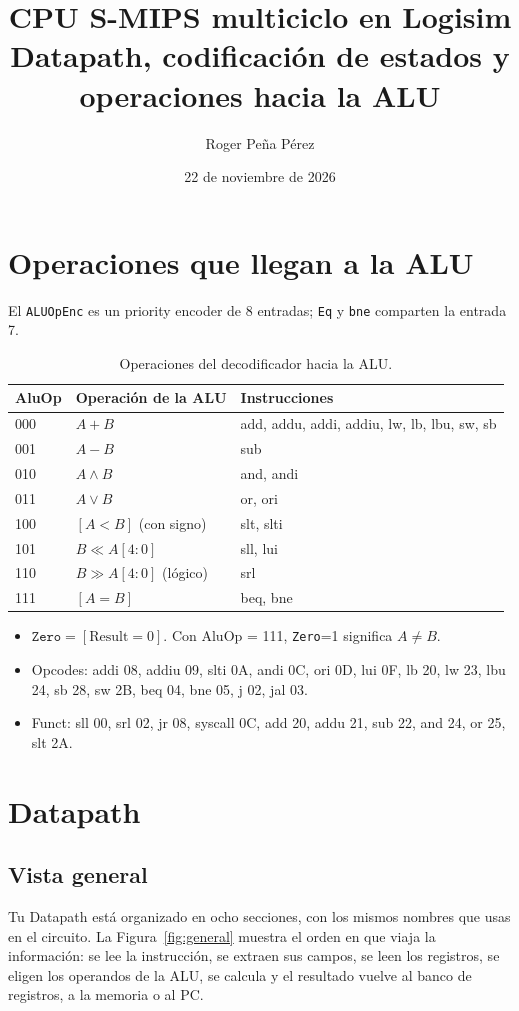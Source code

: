 \documentclass[11pt,a4paper]{article}
\title{CPU S-MIPS multiciclo en Logisim\\[2pt]\large Datapath, codificaci\'on de estados y operaciones hacia la ALU}
\author{Roger Pe\~na P\'erez}
\date{22 de noviembre de 2026}
\newcommand{\sig}[1]{\texttt{#1}}
\begin{document}
\maketitle

\section{Operaciones que llegan a la ALU}
El \texttt{ALUOpEnc} es un priority encoder de 8 entradas; \sig{Eq} y \sig{bne} comparten la entrada 7.

\begin{table}[H]
\centering
\begin{tabular}{llp{6.3cm}}
\toprule
AluOp & Operaci\'on de la ALU & Instrucciones\\
\midrule
000 & $A+B$ & add, addu, addi, addiu, lw, lb, lbu, sw, sb\\
001 & $A-B$ & sub\\
010 & $A\land B$ & and, andi\\
011 & $A\lor B$ & or, ori\\
100 & $[A<B]$ (con signo) & slt, slti\\
101 & $B\ll A[4{:}0]$ & sll, lui\\
110 & $B\gg A[4{:}0]$ (l\'ogico) & srl\\
111 & $[A=B]$ & beq, bne\\
\bottomrule
\end{tabular}
\caption{Operaciones del decodificador hacia la ALU.}
\end{table}

\begin{itemize}
  \item $\sig{Zero}=[\text{Result}=0]$. Con AluOp = 111, \sig{Zero}=1 significa $A\neq B$.
  \item Opcodes: addi 08, addiu 09, slti 0A, andi 0C, ori 0D, lui 0F, lb 20, lw 23, lbu 24, sb 28, sw 2B, beq 04, bne 05, j 02, jal 03.
  \item Funct: sll 00, srl 02, jr 08, syscall 0C, add 20, addu 21, sub 22, and 24, or 25, slt 2A.
\end{itemize}


\section{Datapath}
\subsection{Vista general}
Tu Datapath est\'a organizado en ocho secciones, con los mismos nombres que usas en el circuito. La Figura~\ref{fig:general} muestra el orden en que viaja la informaci\'on: se lee la instrucci\'on, se extraen sus campos, se leen los registros, se eligen los operandos de la ALU, se calcula y el resultado vuelve al banco de registros, a la memoria o al PC.
\end{document}
